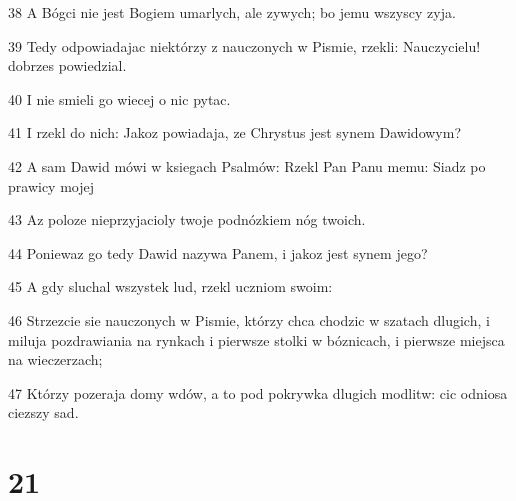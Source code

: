 \par 38 A Bógci nie jest Bogiem umarlych, ale zywych; bo jemu wszyscy zyja.
\par 39 Tedy odpowiadajac niektórzy z nauczonych w Pismie, rzekli: Nauczycielu! dobrzes powiedzial.
\par 40 I nie smieli go wiecej o nic pytac.
\par 41 I rzekl do nich: Jakoz powiadaja, ze Chrystus jest synem Dawidowym?
\par 42 A sam Dawid mówi w ksiegach Psalmów: Rzekl Pan Panu memu: Siadz po prawicy mojej
\par 43 Az poloze nieprzyjacioly twoje podnózkiem nóg twoich.
\par 44 Poniewaz go tedy Dawid nazywa Panem, i jakoz jest synem jego?
\par 45 A gdy sluchal wszystek lud, rzekl uczniom swoim:
\par 46 Strzezcie sie nauczonych w Pismie, którzy chca chodzic w szatach dlugich, i miluja pozdrawiania na rynkach i pierwsze stolki w bóznicach, i pierwsze miejsca na wieczerzach;
\par 47 Którzy pozeraja domy wdów, a to pod pokrywka dlugich modlitw: cic odniosa ciezszy sad.

\chapter{21}

